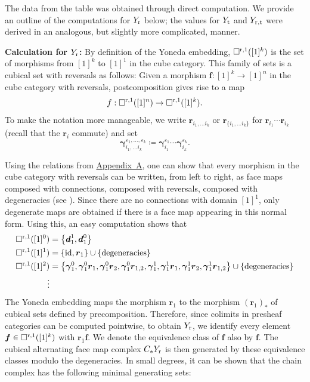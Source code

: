 \documentclass[12pt]{amsart}
\theoremstyle{plain}
\numberwithin{lemma}{\DefaultNumberTheoremWithin}
\numberwithin{claim}{\DefaultNumberTheoremWithin}
\numberwithin{theorem}{\DefaultNumberTheoremWithin}
\numberwithin{corollary}{\DefaultNumberTheoremWithin}
\numberwithin{proposition}{\DefaultNumberTheoremWithin}
\numberwithin{conjecture}{\DefaultNumberTheoremWithin}
\theoremstyle{definition}
\theoremstyle{definition}
\numberwithin{question}{\DefaultNumberTheoremWithin}
\theoremstyle{definition}
\numberwithin{problem}{\DefaultNumberTheoremWithin}
\theoremstyle{remark}
\numberwithin{remark}{\DefaultNumberTheoremWithin}
\theoremstyle{remark}
\numberwithin{example}{\DefaultNumberTheoremWithin}
\def\blt{*}
\def\ve{\varepsilon}
\def\id{\textnormal{id}}
\def\letbe{\coloneqq}
\def\rev{\textnormal{r}}
\def\trp{\textnormal{t}}
\def\bd{\boldsymbol d}
\def\br{\boldsymbol r}
\def\bg{\boldsymbol\gamma}
\newcommand{\repcub}[3]{\square^{#1,#2}([1]^{#3})} %
\begin{document}
The data from the table was obtained through direct computation. We provide an outline of the computations for $ Y_\rev $ below; the values for $ Y_\trp $ and $ Y_{\rev,\trp} $ were derived in an analogous, but slightly more complicated, manner.

\noindent \textbf{Calculation for $Y_\rev$:} By definition of the Yoneda embedding, $\repcub{\rev}{1}{k}$ is the set of morphisms from $[1]^k$ to $[1]^1$ in the cube category. This family of sets is a cubical set with reversals as follows: Given a morphism $\boldsymbol{f}:[1]^k\to [1]^n$ in the cube category with reversals, postcomposition gives rise to a map
\[
    f:\repcub{\rev}{1}{n}\to \repcub{\rev}{1}{k}.
\]
To make the notation more manageable, we write $\br_{i_1,\dots i_k}$ or  $\br_{\{i_1,\dots i_k\}}$ for  $\br_{i_1}\cdots \br_{i_k}$ (recall that the $\br_i$ commute) and set
$$\bg_{i_1,\dots i_k}^{\ve_1,\dots,\ve_k}\letbe \bg_{i_1}^{\ve_1}\cdots \bg_{i_k}^{\ve_k}.$$

Using the relations from \hyperref[appendix]{Appendix~A}, one can show that
every morphism in the cube category with reversals can be written, from left to right, as face maps composed with connections, composed with reversals, composed with degeneracies (see \cite[Equation (58)]{GrandisMauri}). Since there are no connections with domain $[1]^1$, only degenerate maps are obtained if there is a face map appearing in this normal form. Using this, an easy computation shows that 
\begin{align*}
    \repcub{\rev}{1}{0}&=\left\{\bd_1^1,\bd_1^0 \right\}\\
    \repcub{\rev}{1}{1}&=\left\{\id,\br_1 \right\}\cup\left\{\textnormal{degeneracies}\right\}\\
    \repcub{\rev}{1}{2}&=\left\{\bg_1^0,\bg_1^0\br_1,\bg_1^0\br_2,\bg_1^0\br_{1,2},\bg_1^1,\bg_1^1\br_1,\bg_1^1\br_2,\bg_1^1\br_{1,2}\right\}\cup\left\{\textnormal{degeneracies}\right\}\\
    \vdots
\end{align*}
The Yoneda embedding maps the morphism $\boldsymbol{r}_1$ to the morphism $(\boldsymbol{r}_1)_*$ of cubical sets defined by precomposition.
Therefore, since colimits in presheaf categories can be computed pointwise, to obtain $Y_\rev$, we identify every element $\boldsymbol{f}\in \repcub{\rev}{1}{k}$ with $\br_1 \boldsymbol{f}$.  
We denote the equivalence class of $\boldsymbol{f}$ also by $\boldsymbol{f} $.  The cubical alternating face map complex $C_\blt Y_\rev$ is then generated by these equivalence classes modulo the degeneracies. In small degrees, it can be shown that the chain complex has the following
minimal generating sets:
\end{document}

